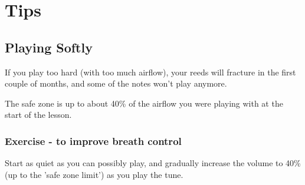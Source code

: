 \section{Tips}
\subsection{Playing Softly}
If you play too hard (with too much airflow), your reeds will fracture in the first couple of months, and some of the notes won't play anymore. 

The safe zone is up to about 40\% of the airflow you were playing with at the start of the lesson. 

\subsubsection{Exercise - to improve breath control}
Start as quiet as you can possibly play, and gradually increase the volume to 40\% (up to the 'safe zone limit') as you play the tune. 